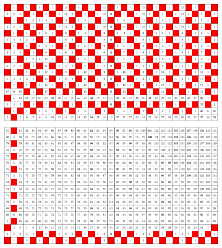 \begin{figure}[]
\centering
\includegraphics[width=\textwidth]{figures/4/18x33x2_numbered_heatmap.pdf}
\caption{}
\label{fig:6x9x2}
\end{figure} 

